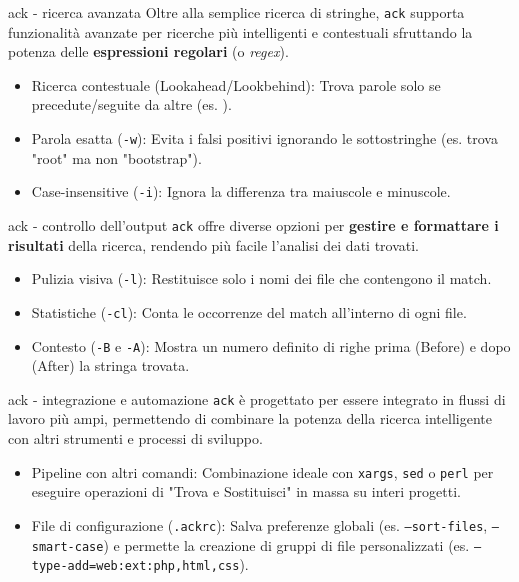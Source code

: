 \begin{frame}[fragile]{ack - ricerca avanzata}
  Oltre alla semplice ricerca di stringhe, \texttt{ack} supporta funzionalità avanzate per ricerche più intelligenti e contestuali sfruttando la potenza delle \textbf{espressioni regolari} (o \textit{regex}).

  \begin{itemize}
  \item Ricerca contestuale (Lookahead/Lookbehind): Trova parole solo se precedute/seguite da altre (es. ).
  \item Parola esatta (\texttt{-w}): Evita i falsi positivi ignorando le sottostringhe (es. trova "root" ma non "bootstrap").
  \item Case-insensitive (\texttt{-i}): Ignora la differenza tra maiuscole e minuscole.
  \end{itemize}

\end{frame}

\begin{frame}[fragile]{ack - controllo dell'output}
  \texttt{ack} offre diverse opzioni per \textbf{gestire e formattare i risultati} della ricerca, rendendo più facile l'analisi dei dati trovati.
  \begin{itemize}
  \item Pulizia visiva (\texttt{-l}): Restituisce solo i nomi dei file che contengono il match.
  \item Statistiche (\texttt{-cl}): Conta le occorrenze del match all'interno di ogni file.
  \item Contesto (\texttt{-B} e \texttt{-A}): Mostra un numero definito di righe prima (Before) e dopo (After) la stringa trovata.
  \end{itemize}
\end{frame}

\begin{frame}[fragile]{ack - integrazione e automazione}
  \texttt{ack} è progettato per essere integrato in flussi di lavoro più ampi, permettendo di combinare la potenza della ricerca intelligente con altri strumenti e processi di sviluppo.

  \begin{itemize}
  \item Pipeline con altri comandi: Combinazione ideale con \texttt{xargs}, \texttt{sed} o \texttt{perl} per eseguire operazioni di "Trova e Sostituisci" in massa su interi progetti.
  \item File di configurazione (\texttt{.ackrc}): Salva preferenze globali (es. \texttt{--sort-files}, \texttt{--smart-case}) e permette la creazione di gruppi di file personalizzati (es. \texttt{--type-add=web:ext:php,html,css}).
  \end{itemize}
\end{frame}

